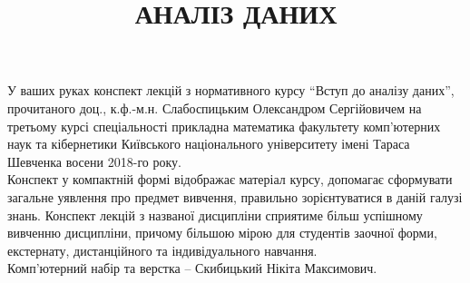 \documentclass[a5paper, 10pt]{article}
\title{{\Huge АНАЛІЗ ДАНИХ}}
\date{}
\begin{document}
\maketitle \thispagestyle{empty} \newpage 

У ваших руках конспект лекцій з нормативного курсу ``Вступ до аналізу даних'', прочитаного доц., к.ф.-м.н. Слабоспицьким Олександром Сергійовичем на третьому курсі спеціальності прикладна математика факультету комп'ютерних наук та кібернетики Київського національного університету імені Тараса Шевченка восени 2018-го року. \\

Конспект у компактній формі відображає матеріал курсу, допомагає сформувати загальне уявлення про предмет вивчення, правильно зорієнтуватися в даній галузі знань. Конспект лекцій з названої дисципліни сприятиме більш успішному вивченню дисципліни, причому більшою мірою для студентів заочної форми, екстернату, дистанційного та індивідуального навчання. \\

Комп'ютерний набір та верстка -- Скибицький Нікіта Максимович. \newpage

\tableofcontents \newpage




















\end{document}
